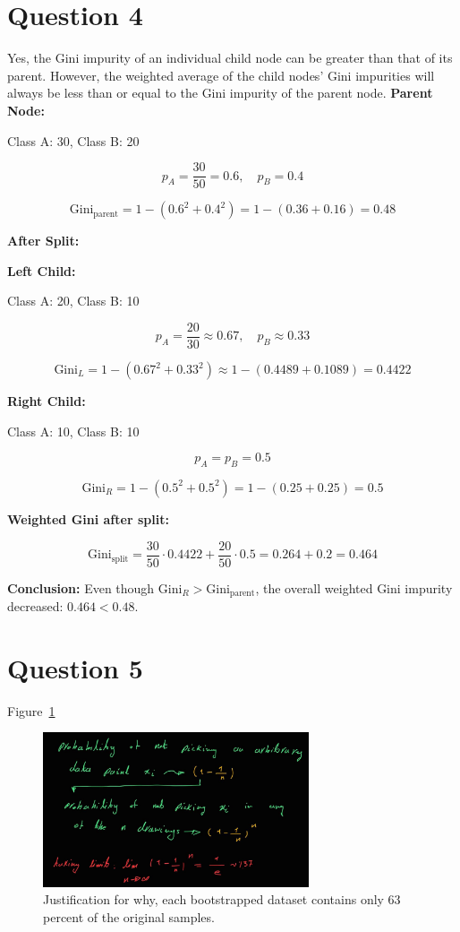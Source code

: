 \documentclass[a4paper,12pt]{article}
\begin{document}
\section*{Question 4}
Yes, the Gini impurity of an individual child node can be greater than that of its parent. However, the weighted average of the child nodes' Gini impurities will always be less than or equal to the Gini impurity of the parent node.
\textbf{Parent Node:}

Class A: 30, \quad Class B: 20

\[
p_A = \frac{30}{50} = 0.6, \quad p_B = 0.4
\]

\[
\text{Gini}_{\text{parent}} = 1 - (0.6^2 + 0.4^2) = 1 - (0.36 + 0.16) = 0.48
\]

\vspace{1em}
\textbf{After Split:}

\textbf{Left Child:}

Class A: 20, \quad Class B: 10

\[
p_A = \frac{20}{30} \approx 0.67, \quad p_B \approx 0.33
\]

\[
\text{Gini}_L = 1 - (0.67^2 + 0.33^2) \approx 1 - (0.4489 + 0.1089) = 0.4422
\]

\textbf{Right Child:}

Class A: 10, \quad Class B: 10

\[
p_A = p_B = 0.5
\]

\[
\text{Gini}_R = 1 - (0.5^2 + 0.5^2) = 1 - (0.25 + 0.25) = 0.5
\]

\vspace{1em}
\textbf{Weighted Gini after split:}

\[
\text{Gini}_{\text{split}} = \frac{30}{50} \cdot 0.4422 + \frac{20}{50} \cdot 0.5 = 0.264 + 0.2 = 0.464
\]

\textbf{Conclusion:} Even though \( \text{Gini}_R > \text{Gini}_{\text{parent}} \), the overall weighted Gini impurity decreased: \( 0.464 < 0.48 \).

\section*{Question 5}
Figure~\ref{fig:fig_3}
\begin{figure}[H]
    \centering
    \includegraphics[width=0.7\textwidth]{../images/q5.jpg}
    \caption{Justification for why, each bootstrapped dataset contains only 63 percent of the original samples.}
    \label{fig:fig_3}
\end{figure}
\end{document}
